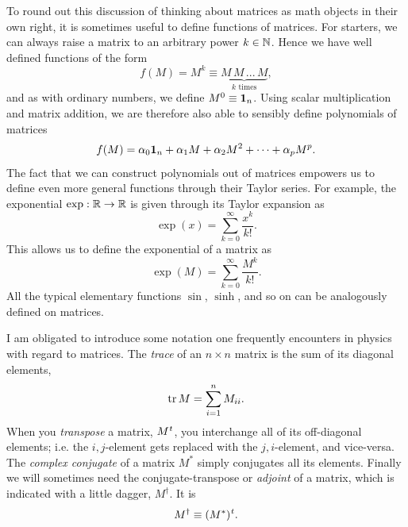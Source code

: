 To round out this discussion of thinking about matrices as math objects in their
own right, it is sometimes useful to define functions of matrices.
For starters, we can always
raise a matrix to an arbitrary power $k\in\mathbb{N}$. Hence we have well defined
functions of the form
\begin{equation}
f(M)=M^k\equiv\underbrace{M\,M\,...\,M}_{k\text{ times}},
\end{equation}
and as with ordinary numbers, we define $M^0\equiv {\mathbf 1}_n$.
Using scalar multiplication and matrix addition, we are therefore also
able to sensibly define polynomials of matrices
\begin{equation}
f(M)=\alpha_0{\mathbf 1}_n + \alpha_1 M + \alpha_2 M^2+\dots+\alpha_p M^p.
\end{equation}
The fact that we can construct polynomials out of matrices empowers us
to define even more general functions through their Taylor series.
For example, the exponential $\exp:\mathbb{R}\to\mathbb{R}$ is given through its Taylor expansion
as
\begin{equation}
\exp(x)=\sum_{k=0}^\infty \frac{x^k}{k!}.
\end{equation}
This allows us to define the exponential of a matrix as
\begin{equation}\label{eq:expMat}
\exp(M)=\sum_{k=0}^\infty \frac{M^k}{k!}.
\end{equation}
All the typical elementary functions $\sin$, $\sinh$, and so on can be
analogously defined on matrices.


I am obligated to introduce some notation one frequently encounters
in physics with regard to matrices. The {\it trace} of an
$n\times n$ matrix is the sum of its diagonal elements,
\begin{equation}
  \tr M=\sum_{i=1}^nM_{ii}.
\end{equation}
When you {\it transpose} a matrix, $\trans{M}$, you interchange all of its
off-diagonal elements; i.e. the $i,j$-element gets replaced with the
$j,i$-element, and vice-versa.
The {\it complex conjugate}
of a matrix $M^*$ simply conjugates all its elements.
Finally we will sometimes need the conjugate-transpose or
{\it adjoint} of a matrix, which is indicated with a
little dagger,
$M^\dagger$. It is
\begin{equation}
M^\dagger\equiv \trans{(M^*)}.
\end{equation}

